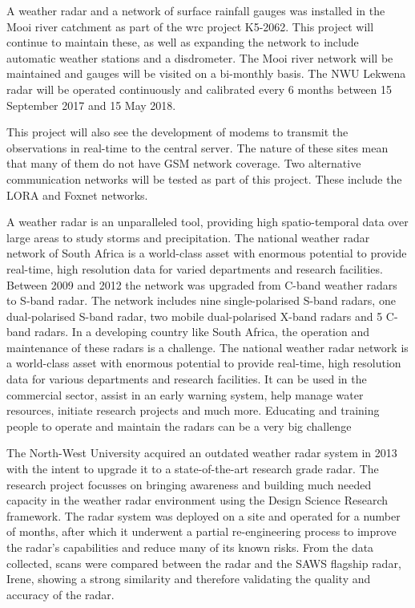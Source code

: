 \documentclass{wrcreport}
\begin{document}
A weather radar and a network of surface rainfall gauges was installed
in the Mooi river catchment as part of the \gls{wrc} project K5-2062.
This project will continue to maintain these, as well as expanding the
network to include automatic weather stations and a disdrometer. The
Mooi river network will be maintained and gauges will be visited on a
bi-monthly basis. The NWU Lekwena radar will be operated continuously
and calibrated every 6 months between 15 September 2017 and 15 May
2018.

This project will also see the development of modems to transmit the
observations in real-time to the central server. The nature of these
sites mean that many of them do not have GSM network coverage. Two
alternative communication networks will be tested as part of this
project. These include the LORA and Foxnet networks.

A weather radar is an unparalleled tool, providing high
spatio-temporal data over large areas to study storms and
precipitation. The national weather radar network of South Africa is a
world-class asset with enormous potential to provide real-time, high
resolution data for varied departments and research facilities.
Between 2009 and 2012 the network was upgraded from C-band weather
radars to S-band radar. The network includes nine single-polarised
S-band radars, one dual-polarised S-band radar, two mobile
dual-polarised X-band radars and 5 C-band radars. In a developing
country like South Africa, the operation and maintenance of these
radars is a challenge. The national weather radar network is a
world-class asset with enormous potential to provide real-time, high
resolution data for various departments and research facilities. It
can be used in the commercial sector, assist in an early warning
system, help manage water resources, initiate research projects and
much more. Educating and training people to operate and maintain the
radars can be a very big challenge

The North-West University acquired an outdated weather radar system in
2013 with the intent to upgrade it to a state-of-the-art research
grade radar. The research project focusses on bringing awareness and
building much needed capacity in the weather radar environment using
the Design Science Research framework. The radar system was deployed
on a site and operated for a number of months, after which it
underwent a partial re-engineering process to improve the radar’s
capabilities and reduce many of its known risks. From the data
collected, scans were compared between the radar and the SAWS flagship
radar, Irene, showing a strong similarity and therefore validating the
quality and accuracy of the radar.
\end{document}
